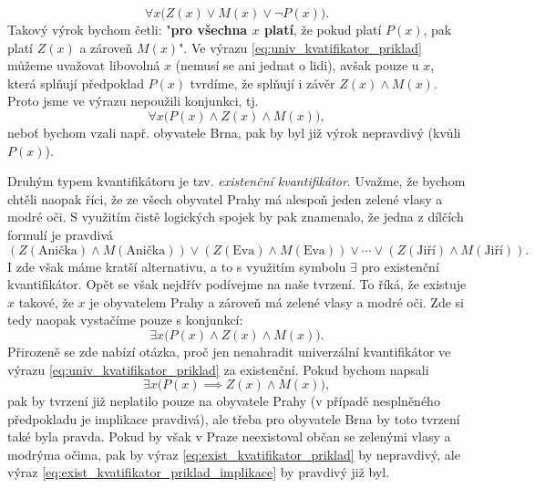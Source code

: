 \begin{equation*}
    \forall x \bigl(Z(x) \lor M(x) \lor \neg P(x)\bigr).
\end{equation*}
Takový výrok bychom četli: "\textbf{pro všechna $x$ platí}, že pokud platí $P(x)$, pak platí $Z(x)$ a zároveň $M(x)$". Ve výrazu \eqref{eq:univ_kvatifikator_priklad} můžeme uvažovat libovolná $x$ (nemusí se ani jednat o lidi), avšak pouze u $x$, která splňují předpoklad $P(x)$ tvrdíme, že splňují i závěr $Z(x) \land M(x)$. Proto jsme ve výrazu nepoužili konjunkci, tj.
\begin{equation*}
    \forall x \bigl(P(x) \land Z(x) \land M(x)\bigr),
\end{equation*}
neboť bychom vzali např. obyvatele Brna, pak by byl již výrok nepravdivý (kvůli $P(x)$).

Druhým typem kvantifikátoru je tzv. \emph{existenční kvantifikátor}. Uvažme, že bychom chtěli naopak říci, že ze všech obyvatel Prahy má alespoň jeden zelené vlasy a modré oči. S využitím čistě logických spojek by pak znamenalo, že jedna z dílčích formulí je pravdivá
\begin{equation*}
    (Z({\text{Anička}}) \land M({\text{Anička}})) \lor (Z({\text{Eva}}) \land M({\text{Eva}})) \lor \cdots \lor (Z({\text{Jiří}}) \land M({\text{Jiří}})).
\end{equation*}
I zde však máme kratší alternativu, a to s využitím symbolu $\exists$ pro existenční kvantifikátor. Opět se však nejdřív podívejme na naše tvrzení. To říká, že existuje $x$ takové, že $x$ je obyvatelem Prahy a zároveň má zelené vlasy a modré oči. Zde si tedy naopak vystačíme pouze s konjunkcí:
\begin{equation}\label{eq:exist_kvatifikator_priklad}
    \exists x \bigl(P(x) \land Z(x) \land M(x)\bigr).
\end{equation}
Přirozeně se zde nabízí otázka, proč jen nenahradit univerzální kvantifikátor ve výrazu \eqref{eq:univ_kvatifikator_priklad} za existenční. Pokud bychom napsali
\begin{equation}\label{eq:exist_kvatifikator_priklad_implikace}
    \exists x \bigl(P(x) \implies Z(x) \land M(x)\bigr),
\end{equation}
pak by tvrzení již neplatilo pouze na obyvatele Prahy (v případě nesplněného předpokladu je implikace pravdivá), ale třeba pro obyvatele Brna by toto tvrzení také byla pravda. Pokud by však v Praze neexistoval občan se zelenými vlasy a modrýma očima, pak by výraz \eqref{eq:exist_kvatifikator_priklad} by nepravdivý, ale výraz \eqref{eq:exist_kvatifikator_priklad_implikace} by pravdivý již byl.
\medskip

